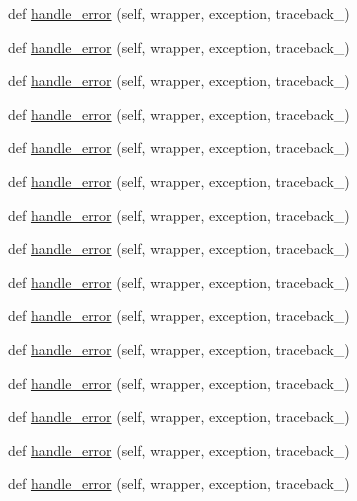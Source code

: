 \begin{DoxyCompactItemize}
\item 
def \hyperlink{classmodulegen____gcc__ILP32_1_1ErrorHandler_a943006387a8560b17fc047599f8e3097}{handle\+\_\+error} (self, wrapper, exception, traceback\+\_\+)
\item 
def \hyperlink{classmodulegen____gcc__ILP32_1_1ErrorHandler_a943006387a8560b17fc047599f8e3097}{handle\+\_\+error} (self, wrapper, exception, traceback\+\_\+)
\item 
def \hyperlink{classmodulegen____gcc__ILP32_1_1ErrorHandler_a943006387a8560b17fc047599f8e3097}{handle\+\_\+error} (self, wrapper, exception, traceback\+\_\+)
\item 
def \hyperlink{classmodulegen____gcc__ILP32_1_1ErrorHandler_a943006387a8560b17fc047599f8e3097}{handle\+\_\+error} (self, wrapper, exception, traceback\+\_\+)
\item 
def \hyperlink{classmodulegen____gcc__ILP32_1_1ErrorHandler_a943006387a8560b17fc047599f8e3097}{handle\+\_\+error} (self, wrapper, exception, traceback\+\_\+)
\item 
def \hyperlink{classmodulegen____gcc__ILP32_1_1ErrorHandler_a943006387a8560b17fc047599f8e3097}{handle\+\_\+error} (self, wrapper, exception, traceback\+\_\+)
\item 
def \hyperlink{classmodulegen____gcc__ILP32_1_1ErrorHandler_a943006387a8560b17fc047599f8e3097}{handle\+\_\+error} (self, wrapper, exception, traceback\+\_\+)
\item 
def \hyperlink{classmodulegen____gcc__ILP32_1_1ErrorHandler_a943006387a8560b17fc047599f8e3097}{handle\+\_\+error} (self, wrapper, exception, traceback\+\_\+)
\item 
def \hyperlink{classmodulegen____gcc__ILP32_1_1ErrorHandler_a943006387a8560b17fc047599f8e3097}{handle\+\_\+error} (self, wrapper, exception, traceback\+\_\+)
\item 
def \hyperlink{classmodulegen____gcc__ILP32_1_1ErrorHandler_a943006387a8560b17fc047599f8e3097}{handle\+\_\+error} (self, wrapper, exception, traceback\+\_\+)
\item 
def \hyperlink{classmodulegen____gcc__ILP32_1_1ErrorHandler_a943006387a8560b17fc047599f8e3097}{handle\+\_\+error} (self, wrapper, exception, traceback\+\_\+)
\item 
def \hyperlink{classmodulegen____gcc__ILP32_1_1ErrorHandler_a943006387a8560b17fc047599f8e3097}{handle\+\_\+error} (self, wrapper, exception, traceback\+\_\+)
\item 
def \hyperlink{classmodulegen____gcc__ILP32_1_1ErrorHandler_a943006387a8560b17fc047599f8e3097}{handle\+\_\+error} (self, wrapper, exception, traceback\+\_\+)
\item 
def \hyperlink{classmodulegen____gcc__ILP32_1_1ErrorHandler_a943006387a8560b17fc047599f8e3097}{handle\+\_\+error} (self, wrapper, exception, traceback\+\_\+)
\item 
def \hyperlink{classmodulegen____gcc__ILP32_1_1ErrorHandler_a943006387a8560b17fc047599f8e3097}{handle\+\_\+error} (self, wrapper, exception, traceback\+\_\+)
\end{DoxyCompactItemize}


